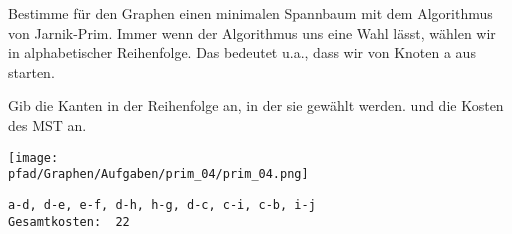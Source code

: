 ﻿\question[3]
Bestimme für den Graphen einen minimalen Spannbaum mit dem Algorithmus von Jarnik-Prim. Immer wenn der Algorithmus uns eine
Wahl lässt, wählen wir in alphabetischer Reihenfolge. Das bedeutet u.a., dass wir von Knoten a aus starten.

Gib die Kanten in der Reihenfolge an, in der sie gewählt werden. und die Kosten des MST an.


\texttt{[image: \\pfad/Graphen/Aufgaben/prim\_04/prim\_04.png]}
\begin{solutionbox}{3cm}
\begin{lstlisting}
a-d, d-e, e-f, d-h, h-g, d-c, c-i, c-b, i-j
Gesamtkosten:  22
\end{lstlisting}
\end{solutionbox}
